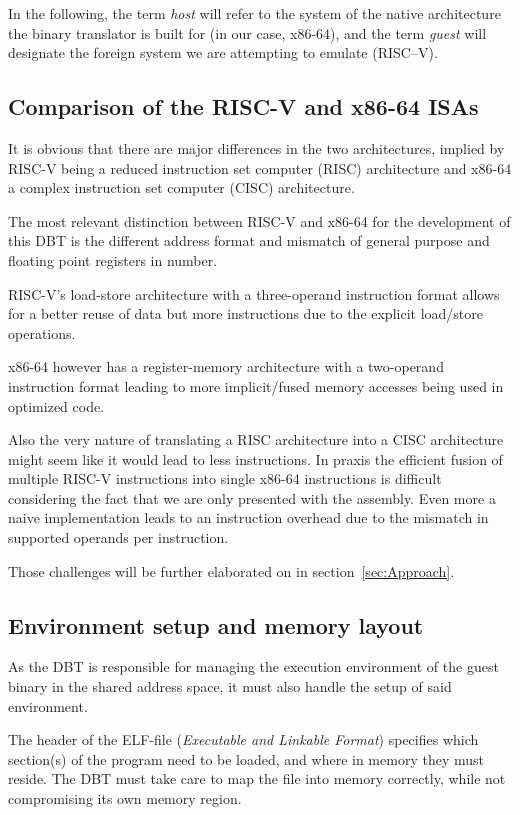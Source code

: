 In the following, the term \textit{host} will refer to the system of the native architecture the binary translator is built for (in our case, x86-64), and the term \textit{guest} will designate the foreign system we are attempting to emulate (RISC--V).

\subsection{Comparison of the RISC-V and x86-64 ISAs}
\label{sec:isa-cmp}
It is obvious that there are major differences in the two architectures, implied by RISC-V being a reduced instruction set computer (RISC) architecture and x86-64 a complex instruction set computer (CISC) architecture.

The most relevant distinction between RISC-V and x86-64 for the development of this DBT is the different address format and mismatch of general purpose and floating point registers in number.

RISC-V's load-store architecture with a three-operand instruction format allows for a better reuse of data but more instructions due to the explicit load/store operations.

x86-64 however has a register-memory architecture with a two-operand instruction format leading to more implicit/fused memory accesses being used in optimized code.

Also the very nature of translating a RISC architecture into a CISC architecture might seem like it would lead to less instructions.
In praxis the efficient fusion of multiple RISC-V instructions into single x86-64 instructions is difficult considering the fact that we are only presented with the assembly.
Even more a naive implementation leads to an instruction overhead due to the mismatch in supported operands per instruction.

Those challenges will be further elaborated on in section~\ref{sec:Approach}.

\subsection{Environment setup and memory layout}
\label{sec:memory-layout}
As the DBT is responsible for managing the execution environment of the guest binary in the shared address space, it must also handle the setup of said environment.

The header of the ELF-file (\textit{Executable and Linkable Format}) specifies which section(s) of the program need to be loaded, and where in memory they must reside.
The DBT must take care to map the file into memory correctly, while not compromising its own memory region.

